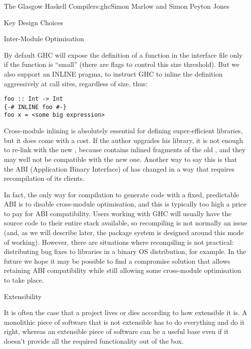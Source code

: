 \begin{aosachapter}{The Glasgow Haskell Compiler}{s:ghc}{Simon Marlow and Simon Peyton Jones}
\begin{aosasect1}{Key Design Choices}
\begin{aosasect2}{Inter-Module Optimisation}
\begin{aosaitemize}
\end{aosaitemize}

By default GHC will expose the definition of a function in the
interface file only if the function is ``small'' (there are flags to
control this size threshold).  But we also support an INLINE pragma,
to instruct GHC to inline the definition aggressively at call sites,
regardless of size, thus:

\begin{verbatim}
foo :: Int -> Int 
{-# INLINE foo #-}
foo x = <some big expression>
\end{verbatim}

Cross-module inlining is absolutely essential for defining
super-efficient libraries, but it does come with a cost.  If the
author upgrades his library, it is not enough to re-link
 with the new , because 
contains inlined fragments of the old , and they may well
not be compatible with the new one.  Another way to say this is that
the ABI (Application Binary Interface) of  has changed in
a way that requires recompilation of its clients.

In fact, the only way for compilation to generate code with a fixed,
predictable ABI is to disable cross-module optimisation, and this is
typically too high a price to pay for ABI compatibility.  Users
working with GHC will usually have the source code to their entire
stack available, so recompiling is not normally an issue (and, as we
will describe later, the package system is designed around this mode
of working).  However, there are situations where recompiling is not
practical: distributing bug fixes to libraries in a binary OS
distribution, for example.  In the future we hope it may be possible
to find a compromise solution that allows retaining ABI compatibility
while still allowing some cross-module optimisation to take place.

\end{aosasect2}

\end{aosasect1}

\begin{aosasect1}{Extensibility}

It is often the case that a project lives or dies according to how
extensible it is.  A monolithic piece of software that is not
extensible has to do everything and do it right, whereas an extensible
piece of software can be a useful base even if it doesn't provide all
the required functionality out of the box.


\end{aosasect1}
\end{aosachapter}
